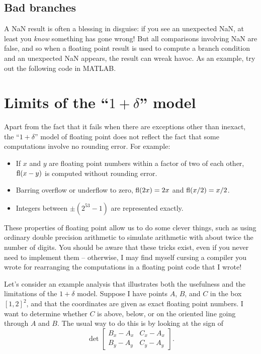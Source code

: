 \documentclass[12pt, leqno]{article}
\begin{document}
\subsection*{Bad branches}

A NaN result is often a blessing in disguise: if you see an
unexpected NaN, at least you {\em know} something has gone wrong!
But all comparisons involving NaN are false,  and so
when a floating point result is used to compute a branch condition
and an unexpected NaN appears, the result can wreak havoc.
As an example, try out the following code in MATLAB.

\lstset{language=matlab,frame=lines,columns=flexible}


\section*{Limits of the ``$1+\delta$'' model}

Apart from the fact that it fails when there are exceptions other than
inexact, the ``$1+\delta$'' model of floating point does not reflect
the fact that some computations involve no rounding error.  For example:
\begin{itemize}
\item
  If $x$ and $y$ are floating point numbers within a factor of two of
  each other, $\operatorname{fl}(x-y)$ is computed without rounding error.
\item
  Barring overflow or underflow to zero, $\operatorname{fl}(2x) = 2x$ and $\operatorname{fl}(x/2) = x/2$.
\item
  Integers between $\pm (2^{53}-1)$ are represented exactly.
\end{itemize}
These properties of floating point allow us to do some clever things,
such as using ordinary double precision arithmetic to simulate
arithmetic with about twice the number of digits.  You should be aware
that these tricks exist, even if you never need to implement them --
otherwise, I may find myself cursing a compiler you
wrote for rearranging the computations in a floating point code that I
wrote!

Let's consider an example analysis that illustrates both the
usefulness and the limitations of the $1+\delta$ model.  Suppose
I have points $A$, $B$, and $C$ in the box $[1,2]^2$, and that the
coordinates are given as exact floating point numbers.  I want to
determine whether $C$ is above, below, or on the oriented line going through
$A$ and $B$.  The usual way to do this is by looking at the sign of
\[
  \det \begin{bmatrix} B_x-A_x & C_x-A_x \\ B_y-A_y & C_y-A_y \end{bmatrix}.
\]
\end{document}
